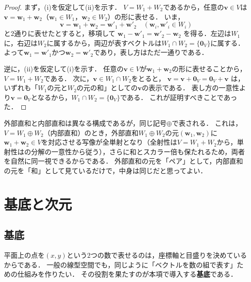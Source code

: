 \begin{tleftbar}
\begin{proof}
  まず，(i)を仮定して(ii)を示す．
  $V = W_1 + W_2$であるから，任意の$\bm{v} \in V$は$\bm{v} = \bm{w}_1 + \bm{w}_2$（$\bm{w}_1 \in W_1$，$\bm{w}_2 \in W_2$）の形に表せる．
  いま，
  \[
    \bm{v} = \bm{w}_1 + \bm{w}_2 = \bm{w}'_1 + \bm{w}'_2
    \quad (\bm{w}_i, \bm{w}'_i \in W_i)
  \]
  と$2$通りに表せたとすると，移項して
  $\bm{w}_1 - \bm{w}'_1 = \bm{w}'_2 - \bm{w}_2$
  を得る．左辺は$W_1$に，右辺は$W_2$に属するから，両辺が表すベクトルは$W_1 \cap W_2 = \{\bm{0}_V\}$に属する．
  よって$\bm{w}_1 = \bm{w}'_1$かつ$\bm{w}_2 = \bm{w}'_2$であり，表し方はただ一通りである．

  逆に，(ii)を仮定して(i)を示す．
  任意の$\bm{v} \in V$が$\bm{w}_1 + \bm{w}_2$の形に表せることから，$V = W_1 + W_2$である．
  次に，$\bm{v} \in W_1 \cap W_2$をとると，
  $\bm{v} = \bm{v} + \bm{0}_V = \bm{0}_V + \bm{v}$
  は，いずれも「$W_1$の元と$W_2$の元の和」としての$\bm{v}$の表示である．
  表し方の一意性より$\bm{v} = \bm{0}_V$となるから，$W_1 \cap W_2 = \{\bm{0}_V\}$である．
  これが証明すべきことであった．
\end{proof}
\end{tleftbar}

\begin{remark}[内部直和と外部直和の同一視]
  外部直和と内部直和は異なる構成であるが，同じ記号$\oplus$で表される．
  これは，$V = W_1 \oplus W_2$（内部直和）のとき，外部直和$W_1 \oplus W_2$の元$(\bm{w}_1, \bm{w}_2)$に$\bm{w}_1 + \bm{w}_2 \in V$を対応させる写像が全単射となり（全射性は$V = W_1 + W_2$から，単射性はの分解の一意性から従う），さらに和とスカラー倍も保たれるため，両者を自然に同一視できるからである．
  外部直和の元を「ペア」として，内部直和の元を「和」として見ているだけで，中身は同じだと思ってよい．
\end{remark}

\section{基底と次元}

\subsection{基底}

平面上の点を$(x,y)$という$2$つの数で表せるのは，座標軸と目盛りを決めているからである．
一般の線型空間でも，同じように「ベクトルを数の組で表す」ための仕組みを作りたい．
その役割を果たすのが本項で導入する\textbf{基底}である．

